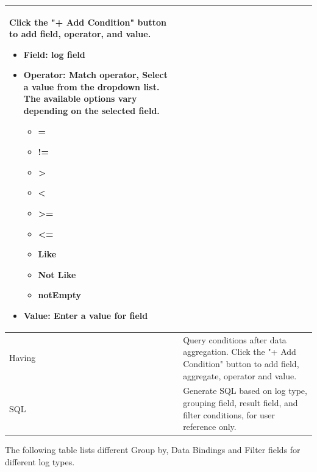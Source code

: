 \begin{description}
\begin{longtable}{p{}|p{}}
                
                        Click the "+ Add Condition" button to add field, operator, and value.
                        \begin{itemize}
                            \item Field: log field 
                            \item Operator: Match operator, Select a value from the dropdown list. The available options vary depending on the selected field.
                            \begin{itemize}
                                \item =    \item!=    \item >    \item <     \item >=    \item <=   \item Like  \item Not Like    \item notEmpty
                            \end{itemize}
                        \item Value: Enter a value for field
                        \end{itemize} \\\hline
                Having & Query conditions after data aggregation. Click the "+ Add Condition" button to add field, aggregate, operator and value. \\\hline
                SQL & Generate SQL based on log type, grouping field, result field, and filter conditions, for user reference only. \\\hline
            \end{longtable} 


        \item[] The following table lists different Group by, Data Bindings and Filter fields for different log types.



\end{description}
